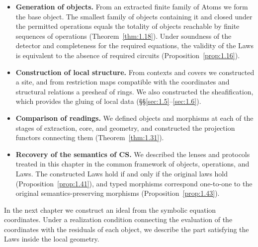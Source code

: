 \begin{itemize}
\item \textbf{Generation of objects.} From an extracted finite family of Atoms
we form the base object. The smallest family of objects containing it and
closed under the permitted operations equals the totality of objects reachable
by finite sequences of operations (Theorem~\ref{thm:1.18}).
Under soundness of the detector and completeness for the required equations,
the validity of the Laws is equivalent to the absence of required circuits
(Proposition~\ref{prop:1.16}).
\item \textbf{Construction of local structure.} From contexts and covers we
constructed a site, and from restriction maps compatible with the coordinates
and structural relations a presheaf of rings. We also constructed the
sheafification, which provides the gluing of local data
(\S\S\ref{sec:1.5}--\ref{sec:1.6}).
\item \textbf{Comparison of readings.} We defined objects and morphisms at
each of the stages of extraction, core, and geometry, and constructed the
projection functors connecting them (Theorem~\ref{thm:1.31}).
\item \textbf{Recovery of the semantics of CS.} We described the lenses and
protocols treated in this chapter in the common framework of objects,
operations, and Laws. The constructed Laws hold if and only if the original
laws hold (Proposition~\ref{prop:1.41}), and typed morphisms correspond
one-to-one to the original semantics-preserving morphisms
(Proposition~\ref{prop:1.43}).
\end{itemize}

In the next chapter we construct an ideal from the symbolic equation
coordinates.
Under a realization condition connecting the evaluation of the coordinates
with the residuals of each object, we describe the part satisfying the Laws
inside the local geometry.
